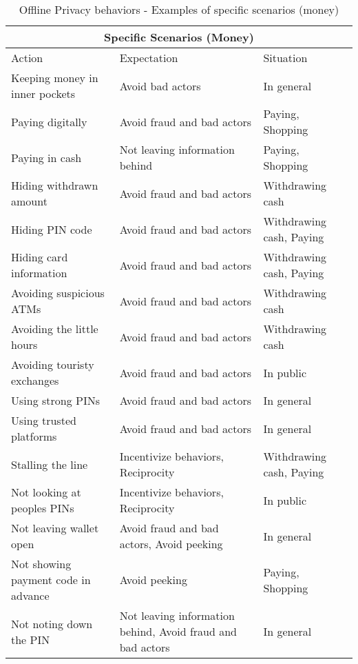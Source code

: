 \begin{table}[H]
    \centering
\begin{tabular}{ |p{5cm}||p{6cm}|p{4cm}|  }
\hline
\multicolumn{3}{|c|}{Specific Scenarios (Money)} \\
\hline
\hline
    Action & Expectation & Situation\\
\hline
\hline
    Keeping money in inner pockets & Avoid bad actors & In general \\
\hline
    Paying digitally & Avoid fraud and bad actors & Paying, Shopping \\
\hline    
    Paying in cash & Not leaving information behind & Paying, Shopping\\
\hline    
    Hiding withdrawn amount & Avoid fraud and bad actors & Withdrawing cash \\
\hline    
    Hiding PIN code & Avoid fraud and bad actors & Withdrawing cash, Paying \\
\hline    
    Hiding card information & Avoid fraud and bad actors & Withdrawing cash, Paying \\
\hline    
    Avoiding suspicious ATMs & Avoid fraud and bad actors & Withdrawing cash \\
\hline    
    Avoiding the little hours & Avoid fraud and bad actors & Withdrawing cash \\
\hline    
    Avoiding touristy exchanges & Avoid fraud and bad actors & In public \\
\hline
    Using strong PINs & Avoid fraud and bad actors & In general \\
\hline    
    Using trusted platforms & Avoid fraud and bad actors & In general \\
\hline    
    Stalling the line & Incentivize behaviors, Reciprocity  & Withdrawing cash, Paying \\
\hline    
    Not looking at peoples PINs & Incentivize behaviors, Reciprocity & In public \\
\hline    
    Not leaving wallet open & Avoid fraud and bad actors, Avoid peeking & In general \\
\hline    
    Not showing payment code in advance & Avoid peeking & Paying, Shopping \\
\hline    
    Not noting down the PIN & Not leaving information behind, Avoid fraud and bad actors & In general \\
\hline    
\end{tabular}
\caption{Offline Privacy behaviors - Examples of specific scenarios (money)}
    \label{tab:meng_t1}
\end{table}


